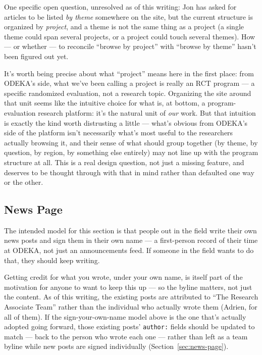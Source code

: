 \documentclass[11pt]{article}
\newcommand{\file}[1]{\texttt{#1}}
\begin{document}
One specific open question, unresolved as of this writing: Jon has
asked for articles to be listed \emph{by theme} somewhere on the site,
but the current structure is organized by \emph{project}, and a theme
is not the same thing as a project (a single theme could span several
projects, or a project could touch several themes). How --- or whether
--- to reconcile ``browse by project'' with ``browse by theme'' hasn't
been figured out yet.

It's worth being precise about what ``project'' means here in the
first place: from ODEKA's side, what we've been calling a project is
really an RCT program --- a specific randomized evaluation, not a
research topic. Organizing the site around that unit seems like the
intuitive choice for what is, at bottom, a program-evaluation research
platform: it's the natural unit of \emph{our} work. But that intuition
is exactly the kind worth distrusting a little --- what's obvious from
ODEKA's side of the platform isn't necessarily what's most useful to
the researchers actually browsing it, and their sense of what should
group together (by theme, by question, by region, by something else
entirely) may not line up with the program structure at all. This is a
real design question, not just a missing feature, and deserves to be
thought through with that in mind rather than defaulted one way or the
other.

\subsection{News Page}
\label{sec:news-todo}

The intended model for this section is that people out in the field
write their own news posts and sign them in their own name --- a
first-person record of their time at ODEKA, not just an announcements
feed. If someone in the field wants to do that, they should keep
writing.

Getting credit for what you wrote, under your own name, is itself part
of the motivation for anyone to want to keep this up --- so the byline
matters, not just the content. As of this writing, the existing posts
are attributed to ``The Research Associate Team'' rather than the
individual who actually wrote them (Adrien, for all of them). If the
sign-your-own-name model above is the one that's actually adopted
going forward, those existing posts' \file{author:} fields should be
updated to match --- back to the person who wrote each one --- rather
than left as a team byline while new posts are signed individually
(Section~\ref{sec:news-page}).
\end{document}
